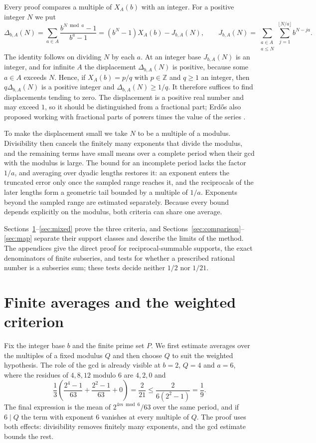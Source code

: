 \documentclass[11pt]{article}
\begin{document}
Every proof compares a multiple of $X_A(b)$ with an integer. For a
positive integer $N$ we put
\begin{equation}
 \Delta_{b,A}(N)=\sum_{a\in A}\frac{b^{N\bmod a}-1}{b^a-1}
 =(b^N-1)X_A(b)-J_{b,A}(N),\qquad
 J_{b,A}(N)=\sum_{\substack{a\in A\\a\le N}}
             \sum_{j=1}^{\lfloor N/a\rfloor}b^{N-ja}.
 \label{eq:intro-displacement}\tag{D}
\end{equation}
The identity follows on dividing $N$ by each $a$. At an integer base
$J_{b,A}(N)$ is an integer, and for infinite $A$ the displacement
$\Delta_{b,A}(N)$ is positive, because some $a\in A$ exceeds $N$.
Hence, if $X_A(b)=p/q$ with $p\in\mathbb Z$ and $q\ge1$ an integer,
then $q\Delta_{b,A}(N)$ is a positive integer and
$\Delta_{b,A}(N)\ge1/q$. It therefore suffices to find displacements
tending to zero. The displacement is a positive real number and may
exceed $1$, so it should be distinguished from a fractional part;
Erd\H{o}s also proposed working with fractional parts of powers times
the value of the series \cite[p.~226]{erdos1968}.

To make the displacement small we take $N$ to be a multiple of a
modulus. Divisibility then cancels the finitely many exponents that
divide the modulus, and the remaining terms have small means over a
complete period when their gcd with the modulus is large. The bound
for an incomplete period lacks the factor $1/a$, and averaging over
dyadic lengths restores it: an exponent enters the truncated error only
once the sampled range reaches it, and the reciprocals of the later
lengths form a geometric tail bounded by a multiple of $1/a$. Exponents
beyond the sampled range are estimated separately. Because every bound
depends explicitly on the modulus, both criteria can share one average.

Sections~\ref{sec:eight-return-extensions}--\ref{sec:mixed} prove the
three criteria, and
Sections~\ref{sec:comparison}--\ref{sec:map} separate their support
classes and describe the limits of the method. The appendices give the
direct proof for reciprocal-summable supports, the exact denominators
of finite subseries, and tests for whether a prescribed rational number
is a subseries sum; these tests decide neither $1/2$ nor $1/21$.

\section{Finite averages and the weighted criterion}
\label{sec:eight-return-extensions}
Fix the integer base $b$ and the finite prime set $P$. We first
estimate averages over the multiples of a fixed modulus $Q$ and then
choose $Q$ to suit the weighted hypothesis. The role of the gcd is
already visible at $b=2$, $Q=4$ and $a=6$, where the residues of
$4,8,12$ modulo $6$ are $4,2,0$ and
\[
 \frac13\left(\frac{2^4-1}{63}+\frac{2^2-1}{63}+0\right)
 =\frac2{21}\le\frac{2}{6(2^2-1)}=\frac19.
\]
The final expression is the mean of $2^{4m\bmod6}/63$ over the same
period, and if $6\mid Q$ the term with exponent $6$ vanishes at every
multiple of $Q$. The proof uses both effects: divisibility removes
finitely many exponents, and the gcd estimate bounds the rest.
\end{document}
